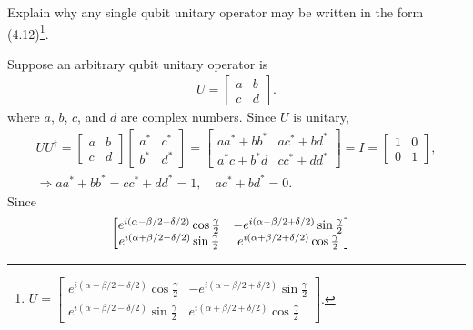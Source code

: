 \documentclass[en]{sol-man}
\begin{document}
\begin{exe}
    Explain why any single qubit unitary operator may be written in the form (4.12)\footnote{$U=\begin{bmatrix}
        e^{i(\alpha-\beta/2-\delta/2)}\cos\frac{\gamma}{2}&-e^{i(\alpha-\beta/2+\delta/2)}\sin\frac{\gamma}{2}\\
        e^{i(\alpha+\beta/2-\delta/2)}\sin\frac{\gamma}{2}&e^{i(\alpha+\beta/2+\delta/2)}\cos\frac{\gamma}{2}
    \end{bmatrix}$.}.
\end{exe}
\begin{sol}
    Suppose an arbitrary qubit unitary operator is
        \begin{align}
            U=\begin{bmatrix}
                a&b\\
                c&d
            \end{bmatrix}.
        \end{align}
        where $a$, $b$, $c$, and $d$ are complex numbers. Since $U$ is unitary,
        \begin{gather}
            UU^{\dagger}=\begin{bmatrix}
                a&b\\
                c&d
            \end{bmatrix}\begin{bmatrix}
                a^*&c^*\\
                b^*&d^*
            \end{bmatrix}=\begin{bmatrix}
                aa^*+bb^*&ac^*+bd^*\\
                a^*c+b^*d&cc^*+dd^*
            \end{bmatrix}=I=\begin{bmatrix}
                1&0\\
                0&1
            \end{bmatrix},\\
            \Longrightarrow aa^*+bb^*=cc^*+dd^*=1,\quad ac^*+bd^*=0.
        \end{gather}
        Since
        \begin{align}
            \notag&\begin{bmatrix}
                e^{i(\alpha-\beta/2-\delta/2)}\cos\frac{\gamma}{2}&-e^{i(\alpha-\beta/2+\delta/2)}\sin\frac{\gamma}{2}\\
                e^{i(\alpha+\beta/2-\delta/2)}\sin\frac{\gamma}{2}&e^{i(\alpha+\beta/2+\delta/2)}\cos\frac{\gamma}{2}

\end{bmatrix}
\end{align}
\end{sol}
\end{document}
